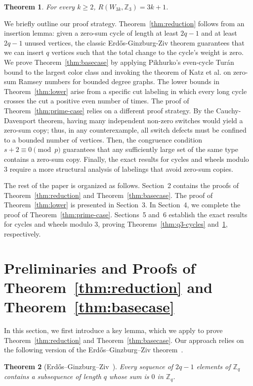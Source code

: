 \documentclass[11pt]{article}
\newtheorem{theorem}{Theorem}[section]
\theoremstyle{remark}
\newcommand{\Z}{\mathbb Z}
\begin{document}
\begin{theorem}\label{thm:q3-wheel}
    For every $k\ge 2$, $R(W_{3k},\Z_3)=3k+1$.
\end{theorem}

We briefly outline our proof strategy.
Theorem~\ref{thm:reduction} follows from an insertion lemma: given a zero-sum cycle of length at least $2q-1$ and at least $2q-1$ unused vertices, the classic Erd\H{o}s-Ginzburg-Ziv theorem guarantees that we can insert $q$ vertices such that the total change to the cycle's weight is zero.
We prove Theorem~\ref{thm:basecase} by applying Pikhurko's even-cycle Tur\'an bound to the largest color class and invoking the theorem of Katz et al. on zero-sum Ramsey numbers for bounded degree graphs.
The lower bounds in Theorem~\ref{thm:lower} arise from a specific cut labeling in which every long cycle crosses the cut a positive even number of times.
The proof of Theorem~\ref{thm:prime-case} relies on a different proof strategy.
By the Cauchy-Davenport theorem, having many independent non-zero switches would yield a zero-sum copy; thus, in any counterexample, all switch defects must be confined to a bounded number of vertices.
Then, the congruence condition $s+2\equiv0\pmod p$ guarantees that any sufficiently large set of the same type contains a zero-sum copy.
Finally, the exact results for cycles and wheels modulo $3$ require a more structural analysis of labelings that avoid zero-sum copies.
\medskip

The rest of the paper is organized as follows.
Section~2 contains the proofs of Theorem~\ref{thm:reduction} and Theorem~\ref{thm:basecase}.
The proof of Theorem~\ref{thm:lower} is presented in Section~3.
In Section~4, we complete the proof of Theorem~\ref{thm:prime-case}.
Sections~5 and~6 establish the exact results for cycles and wheels modulo 3, proving Theorems~\ref{thm:q3-cycles} and~\ref{thm:q3-wheel}, respectively.


\section{Preliminaries and Proofs of Theorem~\ref{thm:reduction} and Theorem~\ref{thm:basecase}}

In this section, we first introduce a key lemma, which we apply to prove Theorem~\ref{thm:reduction} and Theorem~\ref{thm:basecase}.
Our approach relies on the following version of the Erd\H{o}s--Ginzburg--Ziv theorem~\cite{EGZ1961}.

\begin{theorem}[Erd\H{o}s--Ginzburg--Ziv~{\cite{EGZ1961}}]\label{thm:egz}
    Every sequence of $2q-1$ elements of $\Z_q$ contains a subsequence of length $q$ whose sum is $0$ in $\Z_q$.
\end{theorem}
\end{document}
